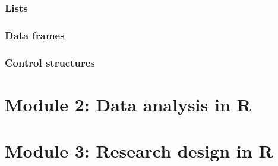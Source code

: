 \documentclass{beamer}
\begin{document}
\begin{frame}[fragile]
    \frametitle{Lists}
    \fontsize{11pt}{10}\selectfont
    
\end{frame}


\begin{frame}[fragile]
    \frametitle{Data frames}
    
\end{frame}


\begin{frame}[fragile]
    \frametitle{Control structures}
    
\end{frame}




\section{Module 2: Data analysis in R}




\section{Module 3: Research design in R}




\end{document}
